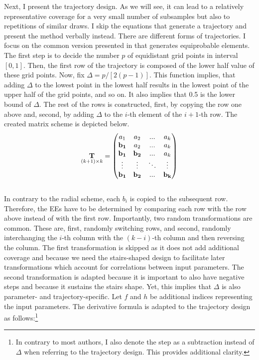 \documentclass[a4paper,12pt]{article}
\begin{document}
\noindent
Next, I present the trajectory design. As we will see, it can lead to a relatively representative coverage for a very small number of subsamples but also to repetitions of similar draws.
I skip the equations that generate a trajectory and present the method verbally instead.
There are different forms of trajectories. I focus on the common version presented in \cite{Morris.1991} that generates equiprobable elements. The first step is to decide the number $p$ of equidistant grid points in interval $[0,1]$. Then, the first row of the trajectory is composed of the lower half value of these grid points. Now, fix $\Delta = p/[2(p-1)]$. This function implies, that adding $\Delta$ to the lowest point in the lowest half results in the lowest point of the upper half of the grid points, and so on. It also implies that 0.5 is the lower bound of $\Delta$. The rest of the rows is constructed, first, by copying the row one above and, second, by adding $\Delta$ to the $i$-th element of the $i+1$-th row. The created matrix scheme is depicted below.
\begin{align}
\underset{(k+1)\times k}{\bold{T}} =
\begin{pmatrix}
a_1 & a_2 & ... & a_k \\
\bold{b_1} & a_2 & ... & a_k \\
\bold{b_1} & \bold{b_2} & ... & a_k \\
\vdots & \vdots & 	\ddots & \vdots\\
\bold{b_1} & \bold{b_2} & ... & \bold{b_k}
\end{pmatrix}
\end{align}
\\

\noindent
In contrary to the radial scheme, each $b_i$ is copied to the subsequent row. Therefore, the EEs have to be determined by comparing each row with the row above instead of with the first row.
Importantly, two random transformations are common. These are, first, randomly switching rows, and second, randomly interchanging the $i$-th column with the $(k-i)$-th column and then reversing the column. The first transformation is skipped as it does not add additional coverage and because we need the stairs-shaped design to facilitate later transformations which account for correlations between input parameters. The second transformation is adapted because it is important to also have negative steps and because it sustains the stairs shape. Yet, this implies that $\Delta$ is also parameter- and trajectory-specific. Let $f$ and $h$ be additional indices representing the input parameters. The derivative formula is adapted to the trajectory design as follows:\footnote{In contrary to most authors, I also denote the step as a subtraction instead of $\Delta$ when referring to the trajectory design. This provides additional clarity.}
\end{document}
